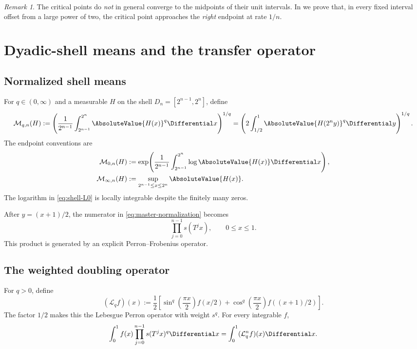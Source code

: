 \documentclass[11pt,oneside]{article}
\theoremstyle{definition}
\theoremstyle{remark}
\newtheorem{remark}[theorem]{Remark}
\begin{document}
\begin{remark}
The critical points do \emph{not} in general converge to the midpoints of their unit
intervals.  In  we prove that, in every fixed interval offset
from a large power of two, the critical point approaches the \emph{right} endpoint at rate
$1/n$.
\end{remark}

\section{Dyadic-shell means and the transfer operator}
\label{sec:Lq-spectrum}

\subsection{Normalized shell means}

For $q\in(0,\infty)$ and a measurable $H$ on the shell
$D_n=[2^{n-1},2^n]$, define
\begin{equation}
 \mathcal M_{q,n}(H)
 :=\left(\frac1{2^{n-1}}\int_{2^{n-1}}^{2^n}\AbsoluteValue{H(x)}^q\Differential x\right)^{1/q}
 =\left(2\int_{1/2}^{1}\AbsoluteValue{H(2^ny)}^q\Differential y\right)^{1/q}.
 \label{eq:shell-Lq}
\end{equation}
The endpoint conventions are
\begin{align}
 \mathcal M_{0,n}(H)
 &:=\exp\!\left(\frac1{2^{n-1}}
       \int_{2^{n-1}}^{2^n}\log\AbsoluteValue{H(x)}\Differential x\right),
 \label{eq:shell-L0}\\
 \mathcal M_{\infty,n}(H)
 &:=\sup_{2^{n-1}\le x\le2^n}\AbsoluteValue{H(x)}.
 \label{eq:shell-Linf}
\end{align}
The logarithm in \eqref{eq:shell-L0} is locally integrable despite the finitely many zeros.

After $y=(x+1)/2$, the numerator in \eqref{eq:master-normalization} becomes
\begin{equation}
 \prod_{j=0}^{n-1}s(T^jx),
 \qquad 0\le x\le1.
 \label{eq:forward-product}
\end{equation}
This product is generated by an explicit Perron--Frobenius operator.

\subsection{The weighted doubling operator}

For $q>0$, define
\begin{equation}
 (\mathcal L_q f)(x)
 :=\frac12\left[
   \sin^q\!\left(\frac{\pi x}{2}\right)f(x/2)
  +\cos^q\!\left(\frac{\pi x}{2}\right)f((x+1)/2)
 \right].
 \label{eq:transfer-operator}
\end{equation}
The factor $1/2$ makes this the Lebesgue Perron operator with weight $s^q$.
For every integrable $f$,
\begin{equation}
 \int_0^1 f(x)\prod_{j=0}^{n-1}s(T^jx)^q\Differential x
 =\int_0^1(\mathcal L_q^n f)(x)\Differential x.
 \label{eq:transfer-duality}
\end{equation}
\end{document}
